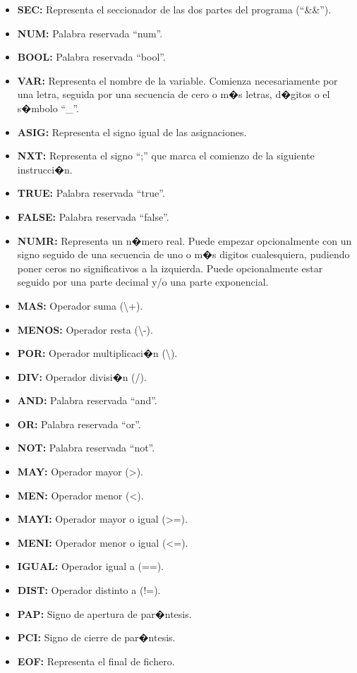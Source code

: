 \documentclass[11pt,oneside,onecolumn,openany,spanish]{book}
\begin{document}
\begin{itemize}
	\item \textbf{SEC:} Representa el seccionador de las dos partes del programa ("`\&\&"').
	\item \textbf{NUM:} Palabra reservada "`num"'.
	\item \textbf{BOOL:} Palabra reservada "`bool"'.
	\item \textbf{VAR:} Representa el nombre de la variable. Comienza necesariamente por una letra, seguida por una secuencia de cero o m�s letras, d�gitos o el s�mbolo "`\_"'.
	\item \textbf{ASIG:} Representa el signo igual de las asignaciones.
	\item \textbf{NXT:} Representa el signo "`;"' que marca el comienzo de la siguiente instrucci�n.
	\item \textbf{TRUE:} Palabra reservada "`true"'.
	\item \textbf{FALSE:} Palabra reservada "`false"'.
	\item \textbf{NUMR:} Representa un n�mero real. Puede empezar opcionalmente con un signo seguido de una secuencia de uno o m�s digitos cualesquiera, pudiendo poner ceros no significativos a la izquierda. Puede opcionalmente estar seguido por una parte decimal y/o una parte exponencial.
	\item \textbf{MAS:} Operador suma (\textbackslash +).
	\item \textbf{MENOS:} Operador resta (\textbackslash -).
	\item \textbf{POR:} Operador multiplicaci�n (\textbackslash *).
	\item \textbf{DIV:} Operador divisi�n (/).
	\item \textbf{AND:} Palabra reservada "`and"'.
	\item \textbf{OR:} Palabra reservada "`or"'.
	\item \textbf{NOT:} Palabra reservada "`not"'.
	\item \textbf{MAY:} Operador mayor (>).
	\item \textbf{MEN:} Operador menor (<).
	\item \textbf{MAYI:} Operador mayor o igual (>=).
	\item \textbf{MENI:} Operador menor o igual (<=).
	\item \textbf{IGUAL:} Operador igual a (==).
	\item \textbf{DIST:} Operador distinto a (!=).
	\item \textbf{PAP:} Signo de apertura de par�ntesis.
	\item \textbf{PCI:} Signo de cierre de par�ntesis.
	\item \textbf{EOF:} Representa el final de fichero.

\end{itemize}
\end{document}
